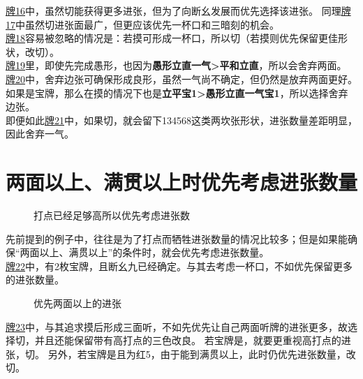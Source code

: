 \hyperref[lec6:pai16-21]{牌16}中，虽然切能获得更多进张，但为了向断幺发展而优先选择该进张。
同理\hyperref[lec6:pai16-21]{牌17}中虽然切进张面最广，但更应该优先一杯口和三暗刻的机会。\\
\hyperref[lec6:pai16-21]{牌18}容易被忽略的情况是：若摸可形成一杯口，所以切（若摸则优先保留更佳形状，改切）。\\\hyperref[lec6:pai16-21]{牌19}里，即使先完成愚形，也因为\textbf{愚形立直一气>平和立直}，所以会舍弃两面。\\\hyperref[lec6:pai16-21]{牌20}中，舍弃边张可确保形成良形，虽然一气尚不确定，但仍然是放弃两面更好。如果是宝牌，那么在摸的情况下也是\textbf{立平宝1>愚形立直一气宝1}，所以选择舍弃边张。\\
即便如此\hyperref[lec6:pai16-21]{牌21}中，如果切，就会留下134568这类两坎张形状，进张数量差距明显，因此舍弃一气。

\section{两面以上、满贯以上时优先考虑进张数量}
\begin{figure}[h]
    \caption{打点已经足够高所以优先考虑进张数}
    \label{lec6:pai22}
\end{figure}
先前提到的例子中，往往是为了打点而牺牲进张数量的情况比较多；但是如果能确保“两面以上、满贯以上”的条件时，就会优先考虑进张数量。\\
\hyperref[lec6:pai22]{牌22}中，有2枚宝牌，且断幺九已经确定。与其去考虑一杯口，不如优先保留更多的进张数量。\\
\begin{figure}[h]
    \caption{优先两面以上的进张}
    \label{lec6:pai23}
\end{figure}
\hyperref[lec6:pai23]{牌23}中，与其追求摸后形成三面听，不如先优先让自己两面听牌的进张更多，故选择切，并且还能保留带有高打点的三色改良。
若宝牌是，就要更重视高打点的进张，切。
另外，若宝牌是且为红5，由于能到满贯以上，此时仍优先进张数量，改切。

